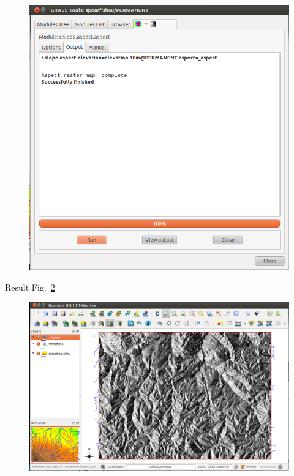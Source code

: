 \begin{figure}[htbp]
   \centering
   \includegraphics[scale=0.25]{qgis043.png}
   \caption{}
   \label{fig:qgis043}
\end{figure}

Result Fig.~\ref{fig:qgis044}

\begin{figure}[htbp]
   \centering
   \includegraphics[scale=0.2]{qgis044.png}
   \caption{}
   \label{fig:qgis044}
\end{figure}

\address{GRASS Development Team\\
  \url{http://grass.itc.it}\\
  }


